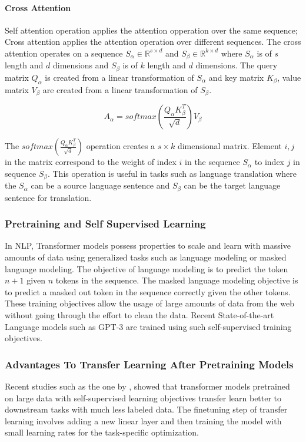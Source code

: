 \paragraph{Cross Attention}
\label{relatedwork:background:transformer:cross-attention}
Self attention operation applies the attention opperation over the same sequence; Cross attention applies the attention operation over different sequences. The cross attention operates on a sequence $S_\alpha \in \mathbb{R}^{s \times d}$ and $S_\beta \in \mathbb{R}^{k \times d}$ where $S_\alpha$ is of $s$ length and $d$ dimensions and $S_\beta$ is of $k$ length and $d$ dimensions. The query matrix $Q_\alpha$ is created from a linear transformation of $S_\alpha$ and key matrix $K_\beta$, value matrix $V_\beta$ are created from a linear transformation of $S_\beta$. 

$$A_\alpha=softmax(\frac{Q_{\alpha}K_{\beta}^{T}}{\sqrt{d}})V_{\beta}$$

The $softmax(\frac{Q_{\alpha}K_{\beta}^{T}}{\sqrt{d}})$ operation creates a $s \times k$ dimensional matrix. Element ${i,j}$ in the matrix correspond to the weight of index $i$ in the sequence $S_\alpha$ to index $j$ in sequence $S_\beta$. This operation is useful in tasks such as language translation where the $S_\alpha$ can be a source language sentence and $S_\beta$ can be the target language sentence for translation.  

\subsubsection{Pretraining and Self Supervised Learning}
In NLP, Transformer models possess properties to scale and learn with massive amounts of data using generalized tasks such as language modeling or masked language modeling. The objective of language modeling is to predict the token $n+1$ given $n$ tokens in the sequence. The masked language modeling objective is to predict a masked out token in the sequence correctly given the other tokens. These training objectives allow the usage of large amounts of data from the web without going through the effort to clean the data. Recent State-of-the-art Language models such as GPT-3 \parencite{brown2020language} are trained using such self-supervised training objectives. 

\subsubsection{Advantages To Transfer Learning After Pretraining Models}
Recent studies such as the one by \cite{hernandez2021scaling}, showed that transformer models pretrained on large data with self-supervised learning objectives transfer learn better to downstream tasks with much less labeled data. The finetuning step\parencite{howard2018universal} of transfer learning involves adding a new linear layer and then training the model with small learning rates for the task-specific optimization. 


